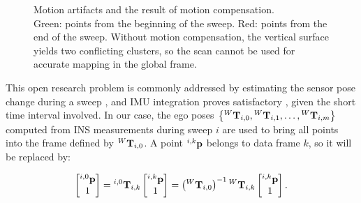 \begin{figure}[h]
	\centering
	\hspace{1pt}
	\caption[Motion compensation: before and after]{Motion artifacts and the result of motion compensation. \\Green: points from the beginning of the sweep. Red: points from the end of the sweep. Without motion compensation, the vertical surface yields two conflicting clusters, so the scan cannot be used for accurate mapping in the global frame.}
	\label{fig:motion-comp}
\end{figure}

This open research problem \cite{motion-comp-mcdermott} is commonly addressed by estimating the sensor pose change during a sweep \cite{vicp,vizzo2023ral}, and IMU integration proves satisfactory \cite{deskewing2020}, given the short time interval involved. In our case, the ego poses
$\left\{{}^W\mathbf{T}_{{i},{0}}, {}^W\mathbf{T}_{{i},{1}}, \dots, {}^W\mathbf{T}_{{i},{m}}\right\}$
computed from INS measurements during sweep $i$ are used to bring all points into the frame defined by ${}^W\mathbf{T}_{{i},{0}}$. A point $^{i,k}\mathbf{p}$ belongs to data frame $k$, so it will be replaced by:

\begin{equation}
	\begin{bmatrix}
		^{i,0}\mathbf{p} \\ 1
	\end{bmatrix}
	= {}^{i,0}\mathbf{T}_{i,k} \begin{bmatrix}
		{}^{i,k}\mathbf{p} \\ 1
	\end{bmatrix}  = \left({{}^W\mathbf{T}_{{i},{0}}}\right)^{-1} {}^W\mathbf{T}_{{i},{k}} \begin{bmatrix}
		{}^{i,k}\mathbf{p} \\ 1
	\end{bmatrix}
	\text{.}
\end{equation}

